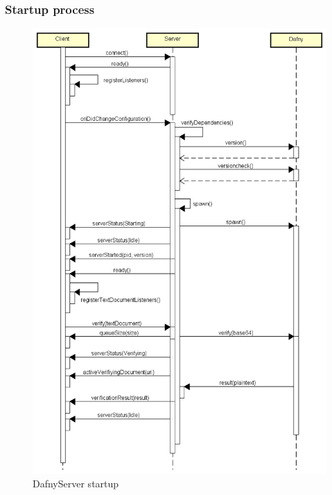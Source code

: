 \subsubsection{Startup process}
\begin{figure}[H]
	\centering
	\includegraphics[width=1\textwidth]{img/DafnyStartupFull}
	\caption{DafnyServer startup}
	\label{fig:DafnyServer startup}
\end{figure}

